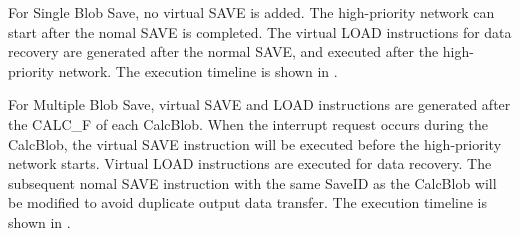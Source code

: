 For Single Blob Save, no virtual SAVE is added. The high-priority network can start after the nomal SAVE is completed. The virtual LOAD instructions for data recovery are generated after the normal SAVE, and executed after the high-priority network. The execution timeline is shown in .

For Multiple Blob Save, virtual SAVE and LOAD instructions are generated after the CALC\_F of each CalcBlob. When the interrupt request occurs during the CalcBlob, the virtual SAVE instruction will be executed before the high-priority network starts. Virtual LOAD instructions are executed for data recovery. The subsequent nomal SAVE instruction with the same SaveID as the CalcBlob will be modified to avoid duplicate output data transfer. The execution timeline is shown in .





